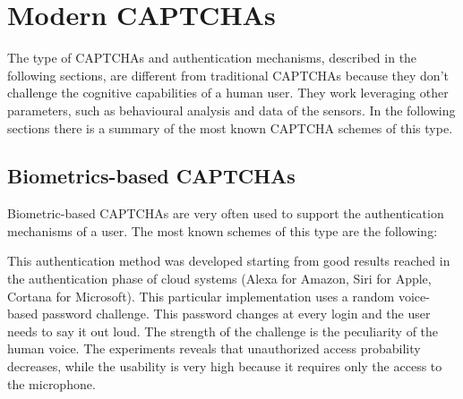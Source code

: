 \section{Modern CAPTCHAs}
The type of CAPTCHAs and authentication mechanisms, described in the following sections, are different from traditional CAPTCHAs because they don't challenge the cognitive capabilities of a human user. They work leveraging other parameters, such as behavioural analysis and data of the sensors. In the following sections there is a summary of the most known CAPTCHA schemes of this type.

\subsection{Biometrics-based CAPTCHAs}\label{soa:Bio_CAPTCHA}
Biometric-based CAPTCHAs are very often used to support the authentication mechanisms of a user. The most known schemes of this type are the following:
\begin{itemize}
{This authentication method was developed starting from good results reached in the authentication phase of cloud systems\cite{voice_CAPTCHA} (Alexa for Amazon, Siri for Apple, Cortana for Microsoft). This particular implementation uses a random voice-based password challenge. This password changes at every login and the user needs to say it out loud. The strength of the challenge is the peculiarity of the human voice. The experiments reveals that unauthorized access probability decreases, while the usability is very high because it requires only the access to the microphone.}
\end{itemize}

